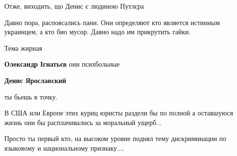 \begin{itemize}
 
Отже, виходить, що Денис є людиною Путлєра

 
Давно пора, распоясались пани. Они определяют кто является истинным украинцем,
а кто био мусор. Давно надо им прикрутить гайки.

 
Тема жирная


\begin{itemize}
 
\textbf{Олександр Ігнатьєв} они психбольные

 
\textbf{Денис Ярославский} 

ты бьешь в точку.

В США или Европе этих куриц юристы раздели бы по полной а оставшуюся жизнь они
бы расплачивались за моральный ущерб...

Просто ты первый кто, на высоком уровне поднял тему дискриминации по языковому
и национальному признаку....
\end{itemize}


\end{itemize}

